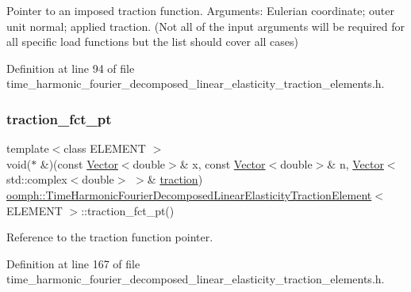 Pointer to an imposed traction function. Arguments\+: Eulerian coordinate; outer unit normal; applied traction. (Not all of the input arguments will be required for all specific load functions but the list should cover all cases) 



Definition at line 94 of file time\+\_\+harmonic\+\_\+fourier\+\_\+decomposed\+\_\+linear\+\_\+elasticity\+\_\+traction\+\_\+elements.\+h.

\mbox{\label{classoomph_1_1TimeHarmonicFourierDecomposedLinearElasticityTractionElement_aa2d72947cde46de0d7b5e335caa0f8b3}} 
\subsubsection{\texorpdfstring{traction\+\_\+fct\+\_\+pt}{traction\_fct\_pt}}
{\footnotesize\ttfamily template$<$class E\+L\+E\+M\+E\+NT $>$ \\
void($\ast$ \&)(const \hyperlink{classoomph_1_1Vector}{Vector}$<$double$>$\& x, const \hyperlink{classoomph_1_1Vector}{Vector}$<$double$>$\& n, \hyperlink{classoomph_1_1Vector}{Vector}$<$std\+::complex$<$double$>$ $>$\& \hyperlink{classoomph_1_1TimeHarmonicFourierDecomposedLinearElasticityTractionElement_ae52e642a75d71228bc008d06c4201092}{traction}) \hyperlink{classoomph_1_1TimeHarmonicFourierDecomposedLinearElasticityTractionElement}{oomph\+::\+Time\+Harmonic\+Fourier\+Decomposed\+Linear\+Elasticity\+Traction\+Element}$<$ E\+L\+E\+M\+E\+NT $>$\+::traction\+\_\+fct\+\_\+pt()\hspace{0.3cm}{\ttfamily [inline]}}



Reference to the traction function pointer. 



Definition at line 167 of file time\+\_\+harmonic\+\_\+fourier\+\_\+decomposed\+\_\+linear\+\_\+elasticity\+\_\+traction\+\_\+elements.\+h.

